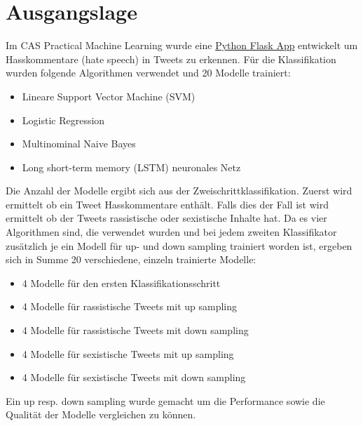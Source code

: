                                                                                                                                                                                                                                                                                                                                                       \section{Ausgangslage}
\label{sec:introduction_purpose}

Im CAS Practical Machine Learning wurde eine \href{http://www.detect-hate.com}{Python Flask App} entwickelt um Hasskommentare (hate speech) in Tweets zu erkennen. F{\"u}r die Klassifikation wurden folgende Algorithmen verwendet und 20 Modelle trainiert:
\begin{itemize}
\item Lineare Support Vector Machine (SVM)
\item Logistic Regression
\item Multinominal Naive Bayes
\item Long short-term memory (LSTM) neuronales Netz
\end{itemize}
Die Anzahl der Modelle ergibt sich aus der Zweischrittklassifikation. Zuerst wird ermittelt ob ein Tweet Hasskommentare enth{\"a}lt. Falls dies der Fall ist wird ermittelt ob der Tweets rassistische oder sexistische Inhalte hat. Da es vier Algorithmen sind, die verwendet wurden und bei jedem zweiten Klassifikator zus{\"a}tzlich je ein Modell f{\"u}r up- und down sampling trainiert worden ist, ergeben sich in Summe 20 verschiedene, einzeln trainierte Modelle:

\begin{itemize}
  \item 4 Modelle f{\"u}r den ersten Klassifikationsschritt
  \item 4 Modelle f{\"u}r rassistische Tweets mit up sampling
  \item 4 Modelle f{\"u}r rassistische Tweets mit down sampling
  \item 4 Modelle f{\"u}r sexistische Tweets mit up sampling
  \item 4 Modelle f{\"u}r sexistische Tweets mit down sampling
\end{itemize}

Ein up resp. down sampling wurde gemacht um die Performance sowie die Qualit{\"a}t der Modelle vergleichen zu k{\"o}nnen.

